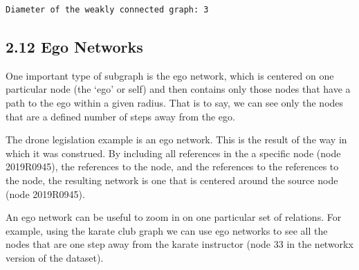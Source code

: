    \begin{Verbatim}[commandchars=\\\{\}]
Diameter of the weakly connected graph: 3
    \end{Verbatim}

    \hypertarget{ego-networks}{%
\subsection{2.12 Ego Networks}\label{ego-networks}}

One important type of subgraph is the ego network, which is centered on
one particular node (the `ego' or self) and then contains only those
nodes that have a path to the ego within a given radius. That is to say,
we can see only the nodes that are a defined number of steps away from
the ego.

The drone legislation example is an ego network. This is the result of
the way in which it was construed. By including all references in the a
specific node (node 2019R0945), the references to the node, and the
references to the references to the node, the resulting network is one
that is centered around the source node (node 2019R0945).

    An ego network can be useful to zoom in on one particular set of
relations. For example, using the karate club graph we can use ego
networks to see all the nodes that are one step away from the karate
instructor (node 33 in the networkx version of the dataset).

